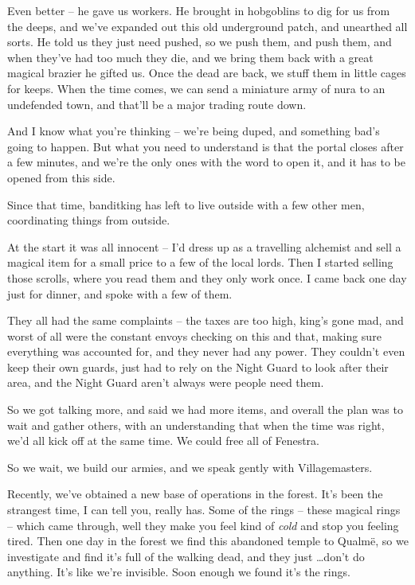 \begin{multicols}{2}
\begin{exampletext}
	Even better -- he gave us workers.
	He brought in hobgoblins to dig for us from the deeps, and we've expanded out this old underground patch, and unearthed all sorts.
	He told us they just need pushed, so we push them, and push them, and when they've had too much they die, and we bring them back with a great magical brazier he gifted us.
	Once the dead are back, we stuff them in little cages for keeps.
	When the time comes, we can send a miniature army of nura to an undefended town, and that'll be a major trading route down.

	And I know what you're thinking -- we're being duped, and something bad's going to happen.  But what you need to understand is that the portal closes after a few minutes, and we're the only ones with the word to open it, and it has to be opened from this side.

\end{exampletext}

Since that time, \gls{banditking} has left to live outside with a few other men, coordinating things from outside.

\begin{exampletext}

	At the start it was all innocent -- I'd dress up as a travelling alchemist and sell a magical item for a small price to a few of the local lords.  Then I started selling those scrolls, where you read them and they only work once.  I came back one day just for dinner, and spoke with a few of them.

	They all had the same complaints -- the taxes are too high, \gls{king}'s gone mad, and worst of all were the constant envoys checking on this and that, making sure everything was accounted for, and they never had any power.  They couldn't even keep their own guards, just had to rely on the Night Guard to look after their area, and the Night Guard aren't always were people need them.

	So we got talking more, and said we had more items, and overall the plan was to wait and gather others, with an understanding that when the time was right, we'd all kick off at the same time.  We could free all of Fenestra.

	So we wait, we build our armies, and we speak gently with Villagemasters.

	Recently, we've obtained a new base of operations in the forest.
	It's been the strangest time, I can tell you, really has.
	Some of the rings -- these magical rings -- which came through, well they make you feel kind of \emph{cold} and stop you feeling tired.
	Then one day in the forest we find this abandoned temple to Qualm\"{e}, so we investigate and find it's full of the walking dead, and they just \ldots don't do anything.
	It's like we're invisible.  Soon enough we found it's the rings.


\end{exampletext}
\end{multicols}
